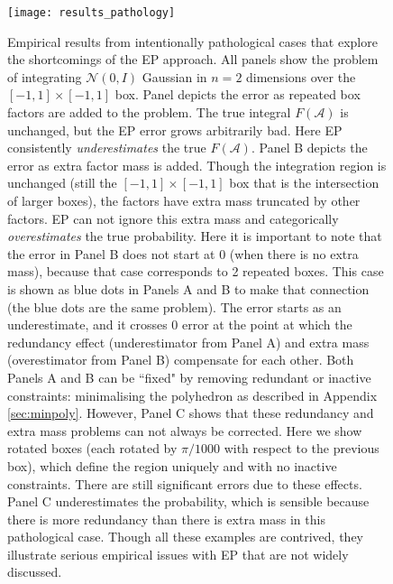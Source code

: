 \documentclass[twoside,11pt]{article}
\def\regionA{\mathcal{A}}
\begin{document}
%
\begin{figure}
\centering
\hspace{0.0cm}
\texttt{[image: results\_pathology]}
\caption{\small{Empirical results from intentionally pathological cases that explore the shortcomings of the EP approach.  All panels show the problem of integrating $\mathcal{N}(0,I)$ Gaussian in $n=2$ dimensions over the $[-1,1] \times [-1,1]$ box.  Panel depicts the error as repeated box factors are added to the problem.  The true integral $F(\regionA)$ is unchanged, but the EP error grows arbitrarily bad.  Here EP consistently \emph{underestimates} the true $F(\regionA)$.  Panel B depicts the error as extra factor mass is added.  Though the integration region is unchanged (still the $[-1,1] \times [-1,1]$ box that is the intersection of larger boxes), the factors have extra mass truncated by other factors.  EP can not ignore this extra mass and categorically \emph{overestimates} the true probability.  Here it is important to note that the error in Panel B does not start at 0 (when there is no extra mass), because that case corresponds to 2 repeated boxes.  This case is shown as blue dots in Panels A and B to make that connection (the blue dots are the same problem).  The error starts as an underestimate, and it crosses 0 error at the point at which the redundancy effect (underestimator from Panel A) and extra mass (overestimator from Panel B) compensate for each other.  Both Panels A and B can be ``fixed" by removing redundant or inactive constraints: minimalising the polyhedron as described in Appendix \ref{sec:minpoly}.  However, Panel C shows that these redundancy and extra mass problems can not always be corrected.  Here we show rotated boxes (each rotated by $\pi/1000$ with respect to the previous box), which define the region uniquely and with no inactive constraints.  There are still significant errors due to these effects.  Panel C underestimates the probability, which is sensible because there is more redundancy than there is extra mass in this pathological case.  Though all these examples are contrived, they illustrate serious empirical issues with EP that are not widely discussed.}}
\label{fig:resultspathology} %
\end{figure}
%
\end{document}
